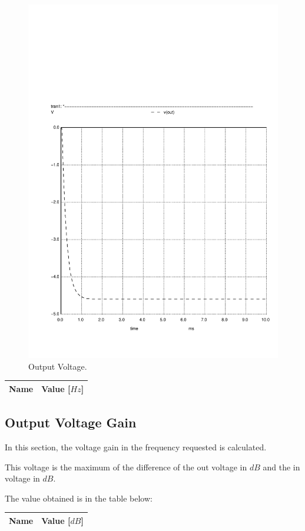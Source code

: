 \begin{figure}[H] \centering
\includegraphics[width=0.7\linewidth]{../sim/vo1.pdf}
\caption{Output Voltage.}
\label{fig:output}
\end{figure}

\begin{table}[H]
  \centering
  \begin{tabular}{|l|r|}
    \hline    
    {\bf Name} & {\bf Value [$Hz$]} \\ \hline
    
  \end{tabular}
  \label{tab:central}
\end{table}

\subsection{Output Voltage Gain}
In this section, the voltage gain in the frequency requested is calculated. \par
This voltage is the maximum of the difference of the out voltage in $dB$ and the in voltage in $dB$. \par
The value obtained is in the table below:

\begin{table}[H]
  \centering
  \begin{tabular}{|l|r|}
    \hline    
    {\bf Name} & {\bf Value [$dB$]} \\ \hline
    
  \end{tabular}
  \label{tab:vgain}
\end{table}

